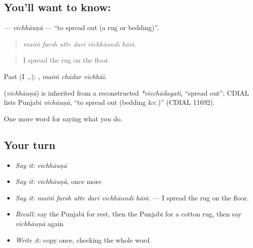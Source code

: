 \subsection*{You'll want to know: }
\textbf{} — \emph{vichhāuṇā} — \textquotedblleft{}to spread out (a rug or bedding)\textquotedblright{}.

\begin{quote}
     
\end{quote}

\begin{quote}
\emph{maiṁ farsh utte darī vichhāundī hāṁ.}
\end{quote}

\begin{quote}
I spread the rug on the floor.
\end{quote}

Past (I …):   , \emph{maiṁ chādar vichhāī}.

\begin{cousinweb}
\textbf{} (\emph{vichhāuṇā}) is inherited from a reconstructed \emph{*vicchādayati}, \textquotedblleft{}spread out\textquotedblright{}; CDIAL lists Punjabi \emph{vichāuṇā}, \textquotedblleft{}to spread out (bedding \&c.)\textquotedblright{} (CDIAL 11692).
\end{cousinweb}

\begin{grammarlens}[title={What you've built}]
One more word for saying what you do.
\end{grammarlens}

\subsection*{Your turn}
\begin{itemize}
\raggedright
  \item \emph{Say it:} \emph{vichhāuṇā}
  \item \emph{Say it:} \emph{vichhāuṇā}, once more
  \item \emph{Say it:} \emph{maiṁ farsh utte darī vichhāundī hāṁ.} — I spread the rug on the floor.
  \item \emph{Recall:} say the Punjabi for rest, then the Punjabi for a cotton rug, then say \emph{vichhāuṇā} again
  \item \emph{Write it:} copy \textbf{} once, checking the whole word
\end{itemize}

